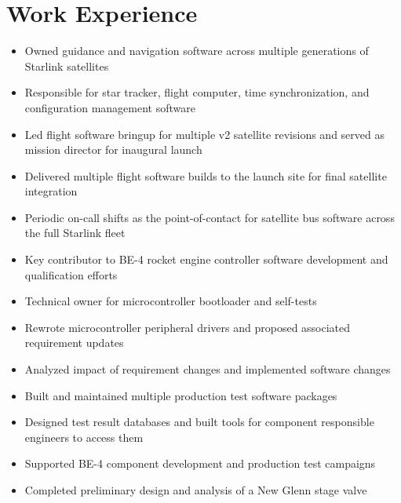 \documentclass{resume}
\begin{document}

\section{Work Experience}
\begin{itemize}
    \item Owned guidance and navigation software across multiple generations of Starlink satellites
    \item Responsible for star tracker, flight computer, time synchronization, and configuration management software
    \item Led flight software bringup for multiple v2 satellite revisions and served as mission director for inaugural launch
    \item Delivered multiple flight software builds to the launch site for final satellite integration
    \item Periodic on-call shifts as the point-of-contact for satellite bus software across the full Starlink fleet
\end{itemize}
\begin{itemize}
    \item Key contributor to BE-4 rocket engine controller software development and qualification efforts
    \item Technical owner for microcontroller bootloader and self-tests
    \item Rewrote microcontroller peripheral drivers and proposed associated requirement updates
    \item Analyzed impact of requirement changes and implemented software changes
\end{itemize}
\begin{itemize}
    \item Built and maintained multiple production test software packages
    \item Designed test result databases and built tools for component responsible engineers to access them
    \item Supported BE-4 component development and production test campaigns
    \item Completed preliminary design and analysis of a New Glenn stage valve
\end{itemize}
\end{document}
